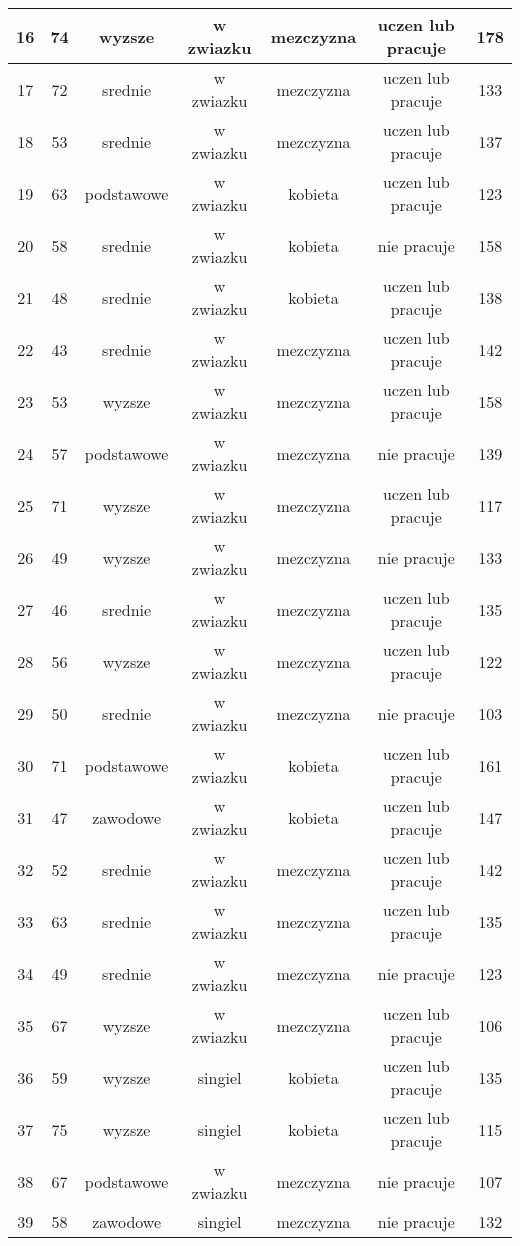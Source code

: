 \documentclass[12pt]{report}\usepackage[]{graphicx}\usepackage[]{color}
\begin{document}
\begin{table}[ht!]
\begin{tabular}{c|c|c|c|c|c|c}
 \hline
16 & 74& wyzsze& w zwiazku& mezczyzna& uczen lub pracuje& 178 \\
 \hline
17 & 72& srednie& w zwiazku& mezczyzna& uczen lub pracuje& 133 \\
 \hline
18 & 53& srednie& w zwiazku& mezczyzna& uczen lub pracuje& 137 \\
 \hline
19 & 63& podstawowe& w zwiazku& kobieta& uczen lub pracuje& 123 \\
 \hline
20 & 58& srednie& w zwiazku& kobieta& nie pracuje& 158 \\
 \hline
21 & 48& srednie& w zwiazku& kobieta& uczen lub pracuje& 138 \\
 \hline
22 & 43& srednie& w zwiazku& mezczyzna& uczen lub pracuje& 142 \\
 \hline
23 & 53& wyzsze& w zwiazku& mezczyzna& uczen lub pracuje& 158 \\
 \hline
24 & 57& podstawowe& w zwiazku& mezczyzna& nie pracuje& 139 \\
 \hline
25 & 71& wyzsze& w zwiazku& mezczyzna& uczen lub pracuje& 117 \\
 \hline
26 & 49& wyzsze& w zwiazku& mezczyzna& nie pracuje& 133 \\
 \hline
27 & 46& srednie& w zwiazku& mezczyzna& uczen lub pracuje& 135 \\
 \hline
28 & 56& wyzsze& w zwiazku& mezczyzna& uczen lub pracuje& 122 \\
 \hline
29 & 50& srednie& w zwiazku& mezczyzna& nie pracuje& 103 \\
 \hline
30 & 71& podstawowe& w zwiazku& kobieta& uczen lub pracuje& 161 \\
 \hline
31 & 47& zawodowe& w zwiazku& kobieta& uczen lub pracuje& 147 \\
 \hline
32 & 52& srednie& w zwiazku& mezczyzna& uczen lub pracuje& 142 \\
 \hline
33 & 63& srednie& w zwiazku& mezczyzna& uczen lub pracuje& 135 \\
 \hline
34 & 49& srednie& w zwiazku& mezczyzna& nie pracuje& 123 \\
 \hline
35 & 67& wyzsze& w zwiazku& mezczyzna& uczen lub pracuje& 106 \\
 \hline
36 & 59& wyzsze& singiel& kobieta& uczen lub pracuje& 135 \\
 \hline
37 & 75& wyzsze& singiel& kobieta& uczen lub pracuje& 115 \\
 \hline
38 & 67& podstawowe& w zwiazku& mezczyzna& nie pracuje& 107 \\
 \hline
39 & 58& zawodowe& singiel& mezczyzna& nie pracuje& 132 \\

\end{tabular}
\end{table}
\end{document}
